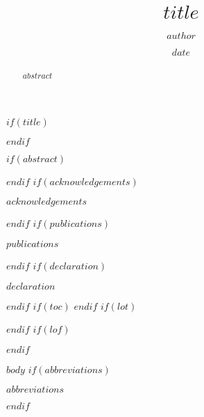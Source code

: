 \documentclass[11pt,twoside]{bristolthesis}
\title{$title$}
\author{$author$}
\date{$date$}
\begin{document}
$if(title)$
  \maketitle
$endif$

\frontmatter %
\pagestyle{empty} %
$if(abstract)$
  \begin{abstract}
    $abstract$
  \end{abstract}
$endif$
$if(acknowledgements)$
  \begin{acknowledgements}
    $acknowledgements$
  \end{acknowledgements}
$endif$
$if(publications)$
  \begin{publications}
    $publications$
  \end{publications}
$endif$
$if(declaration)$
  \begin{declaration}
    $declaration$
  \end{declaration}
$endif$
$if(toc)$
  \hypersetup{linkcolor=$if(toccolor)$$toccolor$$else$black$endif$}
  {
  \setcounter{tocdepth}{$toc-depth$}
  \setcounter{secnumdepth}{$toc-depth$}
  \tableofcontents
  }
$endif$
$if(lot)$
  \listoftables
$endif$
$if(lof)$
  \listoffigures
$endif$

\mainmatter %
\pagestyle{plain}
$body$
$if(abbreviations)$
  \begin{abbreviations}
    $abbreviations$
  \end{abbreviations}
$endif$
\end{document}
